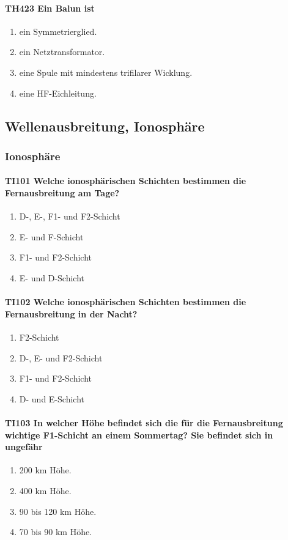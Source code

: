 \documentclass[8pt]{article}
\begin{document}
\paragraph*{TH423 Ein Balun ist} 
\begin{enumerate}[nolistsep,label=\Alph*]
\item ein Symmetrierglied.
\item ein Netztransformator.
\item eine Spule mit mindestens trifilarer Wicklung.
\item eine HF-Eichleitung.
\end{enumerate}

\pagebreak
\subsection{Wellenausbreitung, Ionosphäre}
\subsubsection{Ionosphäre}
\paragraph*{TI101 Welche ionosphärischen Schichten bestimmen die Fernausbreitung am Tage?}
\begin{enumerate}[nolistsep,label=\Alph*]
\item D-, E-, F1- und F2-Schicht
\item E- und F-Schicht
\item F1- und F2-Schicht
\item E- und D-Schicht
\end{enumerate}

\paragraph*{TI102 Welche ionosphärischen Schichten bestimmen die Fernausbreitung in der Nacht?}
\begin{enumerate}[nolistsep,label=\Alph*]
\item F2-Schicht
\item D-, E- und F2-Schicht
\item F1- und F2-Schicht
\item D- und E-Schicht
\end{enumerate}

\paragraph*{TI103 In welcher Höhe befindet sich die für die Fernausbreitung wichtige F1-Schicht an einem Sommertag? Sie befindet sich in ungefähr}
\begin{enumerate}[nolistsep,label=\Alph*]
\item 200 km Höhe.
\item 400 km Höhe.
\item 90 bis 120 km Höhe.
\item 70 bis 90 km Höhe.
\end{enumerate}
\end{document}
